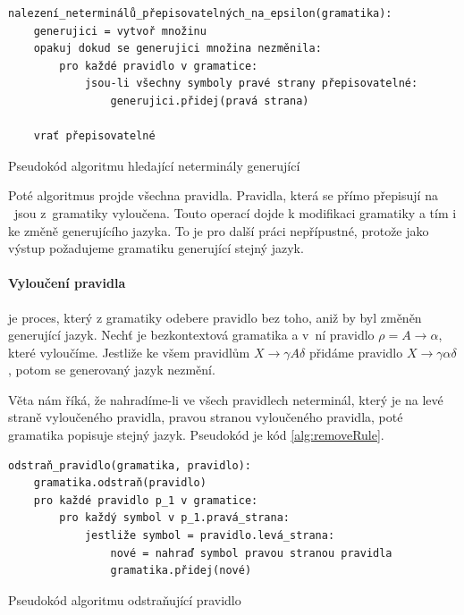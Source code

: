 	\begin{listing}[h]
		\begin{verbatim}
nalezení_neterminálů_přepisovatelných_na_epsilon(gramatika):
	generujici = vytvoř množinu
	opakuj dokud se generujici množina nezměnila:
		pro každé pravidlo v gramatice:
			jsou-li všechny symboly pravé strany přepisovatelné:
				generujici.přidej(pravá strana)

	vrať přepisovatelné
		\end{verbatim}
		\caption{Pseudokód algoritmu hledající neterminály generující \Eps}
		\label{alg:searchEpsilonGenerating}
	\end{listing}
	
	Poté algoritmus projde všechna pravidla. Pravidla, která se přímo přepisují na \Eps~jsou z~gramatiky vyloučena. Touto operací dojde k modifikaci gramatiky a tím i ke změně generujícího jazyka. To je pro další práci nepřípustné, protože jako výstup požadujeme gramatiku generující stejný jazyk.
	
	\paragraph{Vyloučení pravidla}
	je proces, který z gramatiky odebere pravidlo bez toho, aniž by byl změněn generující jazyk. Nechť \GrammarDef\space je bezkontextová gramatika a v~ní pravidlo $\rho=A\rightarrow\alpha$, které vyloučíme. Jestliže ke všem pravidlům $X\rightarrow\gamma A \delta$ přidáme pravidlo $X\rightarrow\gamma\alpha\delta$, potom se generovaný jazyk nezmění.
	
	\vspace{1em}
	
	Věta nám říká, že nahradíme-li ve všech pravidlech neterminál, který je na levé straně vyloučeného pravidla, pravou stranou vyloučeného pravidla, poté gramatika popisuje stejný jazyk. Pseudokód je kód \ref{alg:removeRule}.
	
	\begin{listing}[h]
		\begin{verbatim}
odstraň_pravidlo(gramatika, pravidlo):
	gramatika.odstraň(pravidlo)
	pro každé pravidlo p_1 v gramatice:
		pro každý symbol v p_1.pravá_strana:
			jestliže symbol = pravidlo.levá_strana:
				nové = nahraď symbol pravou stranou pravidla
				gramatika.přidej(nové)
		\end{verbatim}
		\caption{Pseudokód algoritmu odstraňující pravidlo}
		\label{alg:removeRule}
	\end{listing}
	
